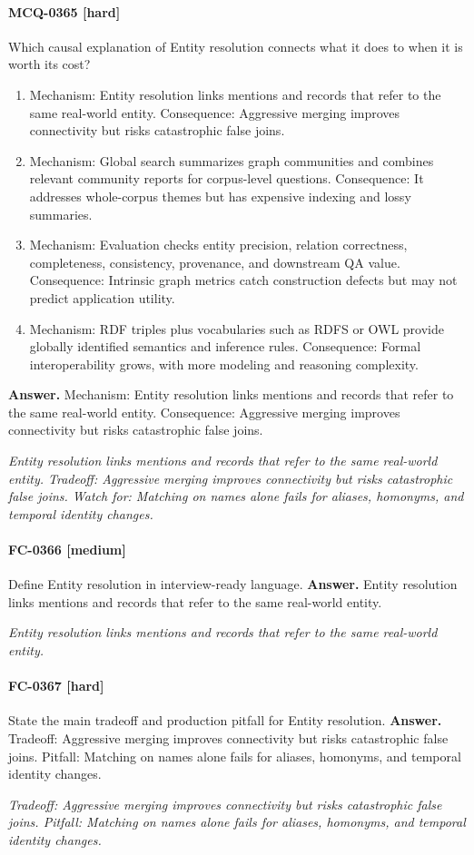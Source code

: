 \paragraph{MCQ-0365 [hard]} Which causal explanation of Entity resolution connects what it does to when it is worth its cost?
\begin{enumerate}[label=\Alph*.]
\item Mechanism: Entity resolution links mentions and records that refer to the same real-world entity. Consequence: Aggressive merging improves connectivity but risks catastrophic false joins.
\item Mechanism: Global search summarizes graph communities and combines relevant community reports for corpus-level questions. Consequence: It addresses whole-corpus themes but has expensive indexing and lossy summaries.
\item Mechanism: Evaluation checks entity precision, relation correctness, completeness, consistency, provenance, and downstream QA value. Consequence: Intrinsic graph metrics catch construction defects but may not predict application utility.
\item Mechanism: RDF triples plus vocabularies such as RDFS or OWL provide globally identified semantics and inference rules. Consequence: Formal interoperability grows, with more modeling and reasoning complexity.
\end{enumerate}
\noindent\textbf{Answer.} Mechanism: Entity resolution links mentions and records that refer to the same real-world entity. Consequence: Aggressive merging improves connectivity but risks catastrophic false joins.
\par\textit{Entity resolution links mentions and records that refer to the same real-world entity. Tradeoff: Aggressive merging improves connectivity but risks catastrophic false joins. Watch for: Matching on names alone fails for aliases, homonyms, and temporal identity changes.}
\paragraph{FC-0366 [medium]} Define Entity resolution in interview-ready language.
\noindent\textbf{Answer.} Entity resolution links mentions and records that refer to the same real-world entity.
\par\textit{Entity resolution links mentions and records that refer to the same real-world entity.}
\paragraph{FC-0367 [hard]} State the main tradeoff and production pitfall for Entity resolution.
\noindent\textbf{Answer.} Tradeoff: Aggressive merging improves connectivity but risks catastrophic false joins. Pitfall: Matching on names alone fails for aliases, homonyms, and temporal identity changes.
\par\textit{Tradeoff: Aggressive merging improves connectivity but risks catastrophic false joins. Pitfall: Matching on names alone fails for aliases, homonyms, and temporal identity changes.}
